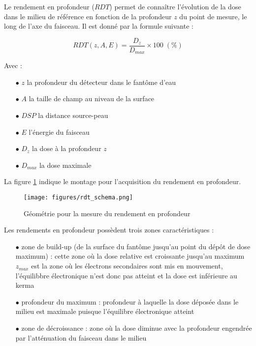 \documentclass{book}
\begin{document}
Le rendement en profondeur ($RDT$) permet de connaître l'évolution de la dose dans le milieu de référence en fonction de la profondeur $z$ du point de mesure, le long de l'axe du faisceau. Il est donné par la formule suivante :

\begin{equation}
    RDT(z, A, E) = \dfrac{D_z}{D_{max}} \times 100 \; (\%)
    \label{eq_rdt}
\end{equation}

Avec :

\begin{itemize}
    \item[$\bullet$] $z$ la profondeur du détecteur dans le fantôme d'eau
    \item[$\bullet$] $A$ la taille de champ au niveau de la surface
    \item[$\bullet$] $DSP$ la distance source-peau
    \item[$\bullet$] $E$ l'énergie du faisceau
    \item[$\bullet$] $D_z$ la dose à la profondeur $z$
    \item[$\bullet$] $D_{max}$ la dose maximale
\end{itemize}

La figure \ref*{fig_rdt} indique le montage pour l'acquisition du rendement en profondeur.

\begin{figure}[h]
  \centering
  \texttt{[image: figures/rdt\_schema.png]}
  \caption{Géométrie pour la mesure du rendement en profondeur}
  \label{fig_rdt}
\end{figure}

Les rendements en profondeur possèdent trois zones caractéristiques :

\begin{itemize}
  \item[$\bullet$] zone de build-up (de la surface du fantôme jusqu'au point du dépôt de dose maximum) : cette zone où la dose relative est croissante jusqu'au maximum $z_{max}$ est la zone où les électrons secondaires sont mis en mouvement, l'équilibbre électronique n'est donc pas atteint et la dose est inférieure au kerma
  \item[$\bullet$] profondeur du maximum : profondeur à laquelle la dose déposée dans le milieu est maximale puisque l'équilibre électronique atteint
  \item[$\bullet$] zone de décroissance : zone où la dose diminue avec la profondeur engendrée par l'atténuation du faisceau dans le milieu
\end{itemize}
\end{document}
